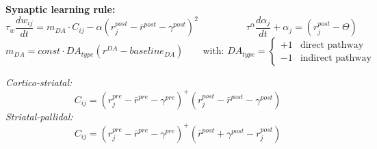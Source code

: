 \documentclass[portrait,final,a0paper,fontscale=0.33]{baposter}
\begin{document}
\begin{poster}
{\begin{adjustbox}{minipage=0.95\textwidth, margin=5pt, center}
		\textbf{Synaptic learning rule:}\\
		$$\tau_w \frac{d w_{ij} }{ dt } = m_{DA} \cdot C_{ij} - \alpha \left(r^{post}_j - \bar{r}^{post} - \gamma^{post}\right)^2 \hspace{5em} \tau^{\alpha} \frac{d \alpha_j }{ dt } + \alpha_j = (r^{post}_j - \Theta)$$ 
		$$
		m_{DA} = const \cdot DA_{type} \left(r^{DA} - baseline_{DA}\right) \hspace{2em} \text{with:  } DA_{type} = \begin{cases} +1 & \text{direct pathway}  \\ -1 & \text{indirect pathway}  \end{cases}
		$$
		
		\textit{Cortico-striatal:}
		$$ C_{ij} = \left(r^{pre}_j - \bar{r}^{pre} - \gamma^{pre}\right)^+ \left(r^{post}_j - \bar{r}^{post} - \gamma^{post}\right) $$
		\textit{Striatal-pallidal:} 
		$$ C_{ij} = \left(r^{pre}_j - \bar{r}^{pre} - \gamma^{pre}\right)^+ \left(\bar{r}^{post} + \gamma^{post} - r^{post}_j \right) $$
	\end{adjustbox}
}





\end{poster}
\end{document}
